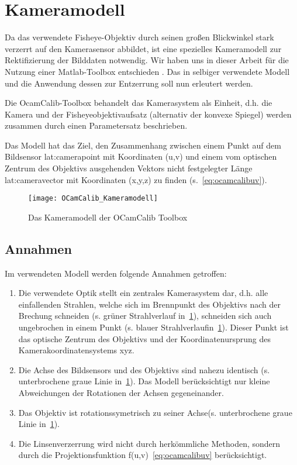 \section{Kameramodell}
Da das verwendete Fisheye-Objektiv durch seinen großen Blickwinkel stark verzerrt auf den Kamerasensor abbildet, ist eine spezielles Kameramodell zur Rektifizierung der Bilddaten notwendig. Wir haben uns in dieser Arbeit für die Nutzung einer Matlab-Toolbox entschieden  \autocite{OCamCalibOmnidirectionalCamera, scaramuzzaFlexibleTechniqueAccurate2006, scaramuzzaToolboxEasilyCalibrating2006, scaramuzzaOmnidirectionalVisionCalibration2007, rufliAutomaticDetectionCheckerboards2008}. Das in selbiger verwendete Modell und die Anwendung dessen zur Entzerrung soll nun erleutert werden. 

Die OcamCalib-Toolbox behandelt das Kamerasystem als Einheit, d.h. die Kamera und der Fisheyeobjektivaufsatz (alternativ der konvexe Spiegel) werden zusammen durch einen Parametersatz beschrieben.

Das Modell hat das Ziel, den Zusammenhang zwischen einem Punkt auf dem Bildsensor \gls{lat:camerapoint} mit Koordinaten (u,v) und einem vom optischen Zentrum des Objektivs ausgehenden Vektors nicht festgelegter Länge \gls{lat:cameravector} mit Koordinaten (x,y,z) zu finden (s.~\eqref{eq:ocamcalibuv}).

\begin{figure}[H]
  \centering
  \texttt{[image: OCamCalib\_Kameramodell]}
  \caption{Das Kameramodell der OCamCalib Toolbox}
  \label{fig:kameramodell}
\end{figure}

\subsection{Annahmen}
Im verwendeten Modell werden folgende Annahmen getroffen:
\begin{enumerate}
\item Die verwendete Optik stellt ein zentrales Kamerasystem dar, d.h. alle einfallenden Strahlen, welche sich im Brennpunkt des Objektivs nach der Brechung schneiden (s. grüner Strahlverlauf in~\ref{fig:kameramodell}), schneiden sich auch ungebrochen in einem Punkt (s. blauer Strahlverlaufin~\ref{fig:kameramodell}). Dieser Punkt ist das optische Zentrum des Objektivs und der Koordinatenursprung des Kamerakoordinatensystems xyz.
\item \label{item:ocamcalibassm2} Die Achse des Bildsensors und des Objektivs sind nahezu identisch (s. unterbrochene graue Linie in~\ref{fig:kameramodell}). Das Modell berücksichtigt nur kleine Abweichungen der Rotationen der Achsen gegeneinander.
\item Das Objektiv ist rotationssymetrisch zu seiner Achse(s. unterbrochene graue Linie in~\ref{fig:kameramodell}).
\item Die Linsenverzerrung wird nicht durch herkömmliche Methoden, sondern durch die Projektionsfunktion f(u,v)~\eqref{eq:ocamcalibuv} berücksichtigt.
\end{enumerate}

